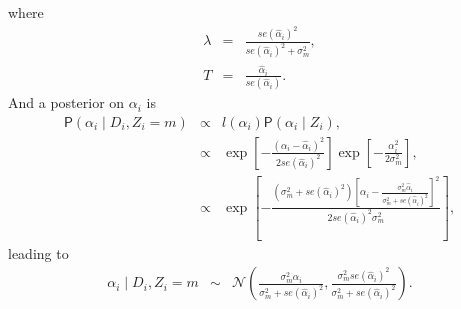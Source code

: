 \documentclass[12pt,letterpaper]{article}
\renewcommand{\Pr}{\mathsf{P}}
\newcommand{\given}{\mid}
\newcommand{\Normal}{\mathcal{N}}
\begin{document}
where 
\begin{eqnarray}
\lambda &=& \frac{se(\hat{\alpha}_i)^2}{se(\hat{\alpha}_i)^2 + \sigma^2_m} ,\\
T &=&  \frac{\hat{\alpha}_i}{se(\hat{\alpha}_i)}.
\end{eqnarray}
And a posterior on $\alpha_i$ is
\begin{eqnarray}
\Pr(\alpha_i \given D_i, Z_i = m) &\propto& l(\alpha_i)\Pr(\alpha_i \given Z_i),\\
					   &\propto&  \exp{[-\frac{\left(\alpha_i -  \hat{\alpha}_i\right)^2}{2se(\hat{\alpha}_i)^2}]} \exp{[-\frac{\alpha_i^2}{2\sigma^2_m}]},\\
					   &\propto&  \exp{[-\frac{\left(\sigma^2_m + se(\hat{\alpha}_i)^2\right)[\alpha_i- \frac{\sigma^2_m \hat{\alpha}_i}{\sigma^2_m + se(\hat{\alpha}_i)^2}]^2}{2se(\hat{\alpha}_i)^2\sigma^2_m}]},
\end{eqnarray}
leading to 
\begin{eqnarray}
\alpha_i \given D_i, Z_i = m &\sim& \Normal(\frac{\sigma^2_m \hat{\alpha}_i}{\sigma^2_m + se(\hat{\alpha}_i)^2}, \frac{\sigma^2_mse(\hat{\alpha}_i)^2}{\sigma^2_m + se(\hat{\alpha}_i)^2}).
\end{eqnarray}

 

\end{document}

